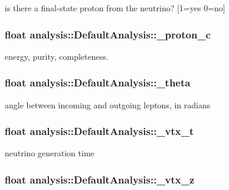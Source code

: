is there a final-\/state proton from the neutrino? \mbox{[}1=yes 0=no\mbox{]} \hypertarget{classanalysis_1_1DefaultAnalysis_a643cc086bdfa4332ced72f6d4e5ce233}{
\subsubsection[{\-\_\-proton\-\_\-c}]{\setlength{\rightskip}{0pt plus 5cm}float analysis\-::\-Default\-Analysis\-::\-\_\-proton\-\_\-c\hspace{0.3cm}{\ttfamily [private]}}}\label{classanalysis_1_1DefaultAnalysis_a643cc086bdfa4332ced72f6d4e5ce233}
energy, purity, completeness. \hypertarget{classanalysis_1_1DefaultAnalysis_adb169ccacccada1a17b6699a25f3fd67}{
\subsubsection[{\-\_\-theta}]{\setlength{\rightskip}{0pt plus 5cm}float analysis\-::\-Default\-Analysis\-::\-\_\-theta\hspace{0.3cm}{\ttfamily [private]}}}\label{classanalysis_1_1DefaultAnalysis_adb169ccacccada1a17b6699a25f3fd67}
angle between incoming and outgoing leptons, in radians \hypertarget{classanalysis_1_1DefaultAnalysis_a39b0367db015ffa41fc4663cb5aeb242}{
\subsubsection[{\-\_\-vtx\-\_\-t}]{\setlength{\rightskip}{0pt plus 5cm}float analysis\-::\-Default\-Analysis\-::\-\_\-vtx\-\_\-t\hspace{0.3cm}{\ttfamily [private]}}}\label{classanalysis_1_1DefaultAnalysis_a39b0367db015ffa41fc4663cb5aeb242}
neutrino generation time \hypertarget{classanalysis_1_1DefaultAnalysis_afd279ca3ddc976b3d509e6c09c0c1514}{
\subsubsection[{\-\_\-vtx\-\_\-z}]{\setlength{\rightskip}{0pt plus 5cm}float analysis\-::\-Default\-Analysis\-::\-\_\-vtx\-\_\-z\hspace{0.3cm}{\ttfamily [private]}}}\label{classanalysis_1_1DefaultAnalysis_afd279ca3ddc976b3d509e6c09c0c1514}
